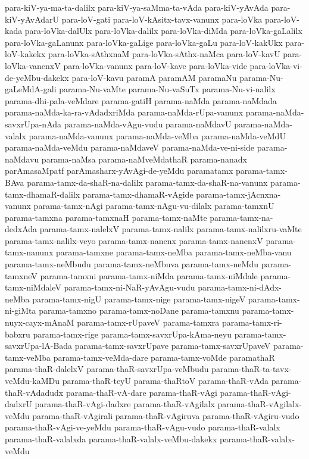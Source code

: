 {para-kiV-ya-ma-ta-dalilx
para-kiV-ya-saMma-ta-vAda
para-kiV-yAvAda
para-kiV-yAvAdarU
para-loV-gati
para-loV-kAsitx-tavx-vanunx
para-loVka
para-loV-kada
para-loVka-dalUlx
para-loVka-dalilx
para-loVka-diMda
para-loVka-gaLalilx
para-loVka-gaLanunx
para-loVka-gaLige
para-loVka-gaLu
para-loV-kakUkx
para-loV-kakekx
para-loVka-sAthxnaM
para-loVka-sAthx-naMca
para-loV-kavU
para-loVka-vanenxV
para-loVka-vanunx
para-loV-kave
para-loVka-vide
para-loVka-vi-de-yeMbu-dakekx
para-loV-kavu
paramA
paramAM
paramaNu
parama-Nu-gaLeMdA-gali
parama-Nu-vaMte
parama-Nu-vaSuTx
parama-Nu-vi-nalilx
parama-dhi-pala-veMdare
parama-gatiH
parama-naMda
parama-naMdada
parama-naMda-ka-ra-vAdadxriMda
parama-naMda-rUpa-vanunx
parama-naMda-savxrUpa-nAda
parama-naMda-vAgu-vudu
parama-naMdavU
parama-naMda-valalx
parama-naMda-vanunx
parama-naMda-veMba
parama-naMda-veMdU
parama-naMda-veMdu
parama-naMdaveV
parama-naMda-ve-ni-side
parama-naMdavu
parama-naMsa
parama-naMveMdathaR
parama-nanadx
parAmasaMpatf
parAmasharx-yAvAgi-de-yeMdu
paramatamx
parama-tamx-BAva
parama-tamx-da-shaR-na-dalilx
parama-tamx-da-shaR-na-vanunx
parama-tamx-dhamaR-dalilx
parama-tamx-dhamaR-vAgide
parama-tamx-jAcnxna-vanunx
parama-tamx-nAgi
parama-tamx-nAgu-vu-dilalx
parama-tamxnU
parama-tamxna
parama-tamxnaH
parama-tamx-naMte
parama-tamx-na-dedxAda
parama-tamx-nalelxV
parama-tamx-nalilx
parama-tamx-nalilxru-vaMte
parama-tamx-nalilx-veyo
parama-tamx-nanenx
parama-tamx-nanenxV
parama-tamx-nanunx
parama-tamxne
parama-tamx-neMba
parama-tamx-neMba-vanu
parama-tamx-neMbudu
parama-tamx-neMbuva
parama-tamx-neMdu
parama-tamxneV
parama-tamxni
parama-tamx-niMda
parama-tamx-niMdale
parama-tamx-niMdaleV
parama-tamx-ni-NaR-yAvAgu-vudu
parama-tamx-ni-dAdx-neMba
parama-tamx-nigU
parama-tamx-nige
parama-tamx-nigeV
parama-tamx-ni-giMta
parama-tamxno
parama-tamx-noDane
parama-tamxnu
parama-tamx-nuyx-cayx-mAnaM
parama-tamx-rUpaveV
parama-tamxra
parama-tamx-ri-babxru
parama-tamx-rige
parama-tamx-savxrUpa-kAma-neyu
parama-tamx-savxrUpa-lA-Bada
parama-tamx-savxrUpave
parama-tamx-savxrUpaveV
parama-tamx-veMba
parama-tamx-veMda-dare
parama-tamx-voMde
paramathaR
parama-thaR-dalelxV
parama-thaR-savxrUpa-veMbudu
parama-thaR-ta-tavx-veMdu-kaMDu
parama-thaR-teyU
parama-thaRtoV
parama-thaR-vAda
parama-thaR-vAdadudx
parama-thaR-vA-dare
parama-thaR-vAgi
parama-thaR-vAgi-dadxrU
parama-thaR-vAgi-dadxre
parama-thaR-vAgilalx
parama-thaR-vAgilalx-veMdu
parama-thaR-vAgirali
parama-thaR-vAgiruva
parama-thaR-vAgiru-vudo
parama-thaR-vAgi-ve-yeMdu
parama-thaR-vAgu-vudo
parama-thaR-valalx
parama-thaR-valalxda
parama-thaR-valalx-veMbu-dakekx
parama-thaR-valalx-veMdu
}
